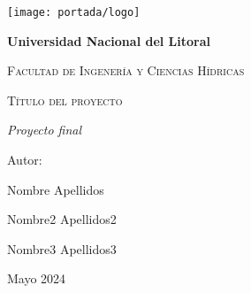 \centering
{\texttt{[image: portada/logo]}\par}
\vspace{1cm}
{\bfseries\LARGE Universidad Nacional del Litoral\par}
\vspace{1cm}
{\scshape\Large Facultad de Ingenería y Ciencias Hídricas \par}
\vspace{3cm}
{\scshape\Huge Título del proyecto \par}
\vspace{3cm}
{\itshape\Large Proyecto final \par}
\vfill
{\Large Autor: \par}
{\Large Nombre Apellidos \par}
{\Large Nombre2 Apellidos2 \par}
{\Large Nombre3 Apellidos3 \par}
\vfill
{\Large Mayo 2024 \par}
